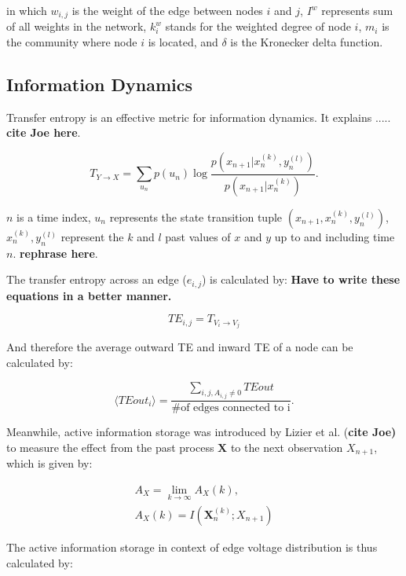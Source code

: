 \documentclass[fleqn,10pt,  reprint, amsmath,amssymb,aps, floatfix]{wlscirep}
\begin{document}
in which $w_{i,j}$ is the weight of the edge between nodes $i$ and $j$, $I^w$ represents sum of all weights in the network, $k_i^w$ stands for the weighted degree of node $i$, $m_i$ is the community where node $i$ is located, and $\delta$ is the Kronecker delta function.

\subsection*{Information Dynamics}

Transfer entropy is an effective metric for information dynamics. It explains ..... \textbf{cite Joe here}.

\begin{equation}
T_{Y \rightarrow X} = \sum \limits_{u_n} p(u_n) \log \frac{p(x_{n+1}| x_n^{(k)}, y_n^{(l)})}{p(x_{n+1}|x_n^{(k)})}.
\end{equation}

$n$ is a time index, $u_n$ represents the state transition tuple $(x_{n+1}, x_n^{(k)}, y_n^{(l)})$, $x_n^{(k)}, y_n^{(l)}$ represent the $k$ and $l$ past values of $x$ and $y$ up to and including time $n$. \textbf{rephrase here}.


The transfer entropy across an edge ($e_{i,j}$) is calculated by:
\textbf{Have to write these equations in a better manner.}

\begin{equation}
TE_{i,j} = T_{V_i \rightarrow V_j}
\end{equation}

And therefore the average outward TE and inward TE of a node can be calculated by:

\begin{equation}
\langle TEout_i \rangle = \frac{\sum \limits_{i,j, A_{i,j} \neq 0} TEout}{\text{\# of edges connected to i}}.
\end{equation}


Meanwhile, active information storage was introduced by Lizier et al. (\textbf{cite Joe)} to measure the effect from the past process $\mathbf X$ to the next observation $X_{n+1}$, which is given by:

\begin{align}
	A_X = \lim \limits_{k \rightarrow \infty} A_X (k),\\
	A_X(k) = I(\mathbf X_n^{(k)}; X_{n+1})
	\label{eq:AIS}
\end{align}

The active information storage in context of edge voltage distribution is thus calculated by:
\end{document}
